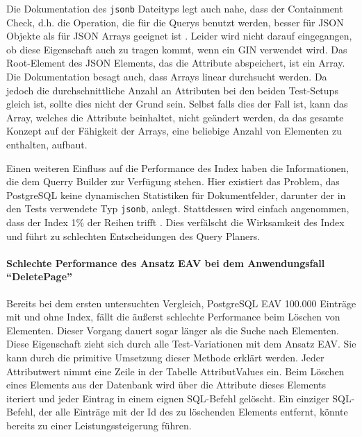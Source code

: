 Die Dokumentation des \lstinline|jsonb| Dateityps legt auch nahe, dass der Containment Check, d.h. die Operation, die für die Querys benutzt werden, besser für JSON Objekte als für JSON Arrays geeignet ist \cite{PostgreSQLDocumentation.2021}. Leider wird nicht darauf eingegangen, ob diese Eigenschaft auch zu tragen kommt, wenn ein \ac{GIN} verwendet wird. Das Root-Element des JSON Elements, das die Attribute abspeichert, ist ein Array. Die Dokumentation besagt auch, dass Arrays linear durchsucht werden. Da jedoch die durchschnittliche Anzahl an Attributen bei den beiden Test-Setups gleich ist, sollte dies nicht der Grund sein. Selbst falls dies der Fall ist, kann das Array, welches die Attribute beinhaltet, nicht geändert werden, da das gesamte Konzept auf der Fähigkeit der Arrays, eine beliebige Anzahl von Elementen zu enthalten, aufbaut.

Einen weiteren Einfluss auf die Performance des Index haben die Informationen, die dem Querry Builder zur Verfügung stehen. Hier existiert das Problem, das PostgreSQL keine dynamischen Statistiken für Dokumentfelder, darunter der in den Tests verwendete Typ \lstinline|jsonb|, anlegt. Stattdessen wird einfach angenommen, dass der Index 1\% der Reihen trifft \cite{VsevolodSolovyov.08.07.2021, DatabaseAdministratorsStackExchange.08.07.2021}. Dies verfälscht die Wirksamkeit des Index und führt zu schlechten Entscheidungen des Query Planers. 





\paragraph{Schlechte Performance des Ansatz EAV bei dem Anwendungsfall ``DeletePage''}


Bereits bei dem ersten untersuchten Vergleich, PostgreSQL EAV 100.000 Einträge mit und ohne Index, fällt die äußerst schlechte Performance beim Löschen von Elementen. Dieser Vorgang dauert sogar länger als die Suche nach Elementen. Diese Eigenschaft zieht sich durch alle Test-Variationen mit dem Ansatz EAV. Sie kann durch die primitive Umsetzung dieser Methode erklärt werden. Jeder Attributwert nimmt eine Zeile in der Tabelle AttributValues ein. Beim Löschen eines Elements aus der Datenbank wird über die Attribute dieses Elements iteriert und jeder Eintrag in einem eignen SQL-Befehl gelöscht. Ein einziger SQL-Befehl, der alle Einträge mit der Id des zu löschenden Elements entfernt, könnte bereits zu einer Leistungssteigerung führen. 


